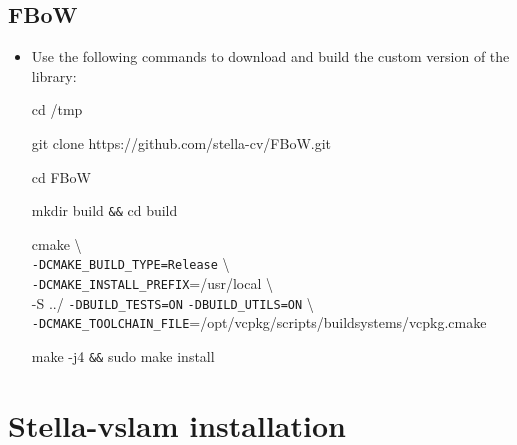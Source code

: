 \documentclass[a4paper,12pt]{book}
\newcommand\tab[1][1cm]{\hspace*{#1}}
\begin{document}
\section{FBoW}
\begin{itemize}
	\item Use the following commands to download and build the custom version of the library:
	
	\vspace{3mm}
	cd /tmp
	
	\vspace{0.05mm}
	git clone https://github.com/stella-cv/FBoW.git
	
	\vspace{0.05mm}
	cd FBoW
	
	\vspace{0.05mm}
	mkdir build \verb*|&&| cd build
	
	\vspace{0.05mm}
	cmake \textbackslash \\
	     \tab \verb*|-DCMAKE_BUILD_TYPE=Release| \textbackslash \\
	     \tab \verb*|-DCMAKE_INSTALL_PREFIX|=/usr/local \textbackslash \\ 
	     \tab -S ../  \verb*|-DBUILD_TESTS=ON| \verb*|-DBUILD_UTILS=ON| \textbackslash \\ 
	     \tab \verb*|-DCMAKE_TOOLCHAIN_FILE|=/opt/vcpkg/scripts/buildsystems/vcpkg.cmake
	
	\vspace{0.05mm}
	make -j4 \verb*|&&| sudo make install
\end{itemize}

\chapter{Stella-vslam installation}
\end{document}
